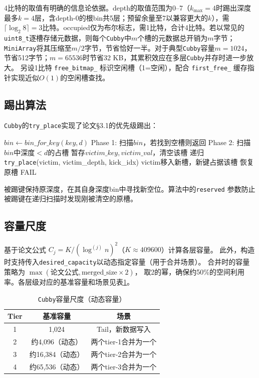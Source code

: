 \documentclass[
    type = bachelor,
    fontset = win,
    decl-page = true,
  ]{njuthesis}
\begin{document}
4比特的取值有明确的信息论依据。depth的取值范围为0--7（$k_{\max}=4$时踢出深度最多$k=4$层，含depth-0的根bin共5层；预留余量至7以兼容更大的$k$），需$\lceil\log_2 8\rceil=3$比特。occupied仅为布尔标志，需1比特，合计4比特。若以常见的\texttt{uint8\_t}逐槽存储元数据，则每个\texttt{Cubby}中$m$个槽的元数据总开销为$m$字节；\texttt{MiniArray}将其压缩至$m/2$字节，节省恰好一半。对于典型\texttt{Cubby}容量$m=1024$，节省512字节；$m=65536$时节省32 KB，其累积效应在多层\texttt{Cubby}并存时进一步放大。
另设1比特 \texttt{free\_bitmap\_} 标识空闲槽（1=空闲），配合
\texttt{first\_free\_} 缓存指针实现近似$O(1)$的空闲槽查找。

\subsection{踢出算法}

\texttt{Cubby}的\texttt{try\_place}实现了论文\S3.1\cite{1}的优先级踢出：

\begin{algorithm}[H]
\caption{try\_place(key, max\_depth)}
\begin{algorithmic}[1]
  \STATE $bin \gets bin\_for\_key(key, d)$
  \STATE Phase 1: 扫描$bin$，若找到空槽则返回
    \STATE Phase 2: 扫描$bin$中深度$< d$的占槽
      \STATE 暂存$victim\_key, victim\_val$，清空该槽
      \STATE 递归\texttt{try\_place}(victim, victim\_depth, kick\_idx)
        \STATE victim移入新槽，新键占据该槽
        \RETURN
      \ELSE \STATE 恢复原槽
      \ENDIF
    \ENDIF
  \ENDIF
\ENDFOR
\RETURN FAIL
\end{algorithmic}
\end{algorithm}

被踢键保持原深度，在其自身深度bin中寻找新空位。算法中的\texttt{reserved}
参数防止被踢键在递归扫描时发现刚被清空的原槽。

\subsection{容量尺度}

基于论文公式 $C_j = K / (\log^{(j)} n)^2$（$K \approx 409600$）\cite{1}计算各层容量。
此外，构造时支持传入\texttt{desired\_capacity}以动态指定容量（用于合并场景）。
合并时的容量策略为 $\max(\text{论文公式}, \text{merged\_size} \times 2)$，
取2的幂，确保约50\%的空间利用率。各层级对应的基准容量和场景见表\ref{tab:cubcap}。

\begin{table}[H]
\centering
\begin{tabular}{c|c|c}
\toprule
Tier & 基准容量 & 场景 \\
\midrule
1 & 1,024 & Tail，新数据写入 \\
2 & 约4,096（动态） & 两个tier-1合并为一个 \\
3 & 约16,384（动态） & 两个tier-2合并为一个 \\
4 & 约65,536（动态） & 两个tier-3合并为一个 \\
\bottomrule
\end{tabular}
\caption{\texttt{Cubby}容量尺度（动态容量）}
\label{tab:cubcap}
\end{table}
\end{document}
